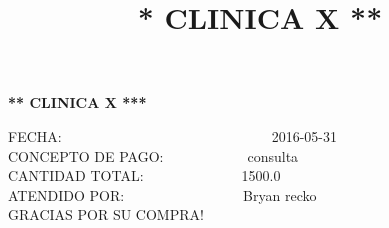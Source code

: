 \documentclass[10pt,a4paper]{letter}
\title{\bf ** CLINICA X **}
\begin{document}
\begin{center}
{\scshape\LARGE \bf *** CLINICA X ***\par}

\end{center}

FECHA:\ \ \ \ \ \ \ \ \ \ \ \ \ \ \ \ \ \ \ \ \ \ \ \ \ \ \ \ \ \ 2016-05-31 \\
CONCEPTO DE PAGO:\ \  \ \ \ \ \ \ \ \  \ \ consulta \\
CANTIDAD TOTAL:\ \ \ \ \ \ \ \ \ \ \ \ \ \ 1500.0 \\
ATENDIDO POR:\ \ \ \ \ \ \ \ \ \ \ \ \ \ \ \ \ Bryan recko \\
GRACIAS POR SU COMPRA! \\ \\

 
\end{document}
